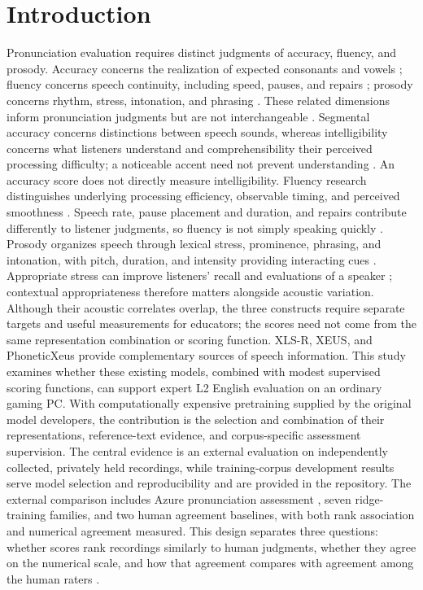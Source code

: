 \documentclass[10pt]{article}
\begin{document}
\section{Introduction}
Pronunciation evaluation requires distinct judgments of accuracy, fluency, and prosody. Accuracy concerns the realization of expected consonants and vowels \cite{deterding,cai}; fluency concerns speech continuity, including speed, pauses, and repairs \cite{kormos,bosker}; prosody concerns rhythm, stress, intonation, and phrasing \cite{cole,cutler}. These related dimensions inform pronunciation judgments but are not interchangeable \cite{cai,isaacs}. Segmental accuracy concerns distinctions between speech sounds, whereas intelligibility concerns what listeners understand and comprehensibility their perceived processing difficulty; a noticeable accent need not prevent understanding \cite{munro}. An accuracy score does not directly measure intelligibility. Fluency research distinguishes underlying processing efficiency, observable timing, and perceived smoothness \cite{segalowitz}. Speech rate, pause placement and duration, and repairs contribute differently to listener judgments, so fluency is not simply speaking quickly \cite{kormos,bosker}. Prosody organizes speech through lexical stress, prominence, phrasing, and intonation, with pitch, duration, and intensity providing interacting cues \cite{cole,cutler}. Appropriate stress can improve listeners' recall and evaluations of a speaker \cite{hahn}; contextual appropriateness therefore matters alongside acoustic variation. Although their acoustic correlates overlap, the three constructs require separate targets and useful measurements for educators; the scores need not come from the same representation combination or scoring function. XLS-R, XEUS, and PhoneticXeus provide complementary sources of speech information. This study examines whether these existing models, combined with modest supervised scoring functions, can support expert L2 English evaluation on an ordinary gaming PC. With computationally expensive pretraining supplied by the original model developers, the contribution is the selection and combination of their representations, reference-text evidence, and corpus-specific assessment supervision. The central evidence is an external evaluation on independently collected, privately held recordings, while training-corpus development results serve model selection and reproducibility and are provided in the repository. The external comparison includes Azure pronunciation assessment \cite{azure}, seven ridge-training families, and two human agreement baselines, with both rank association and numerical agreement measured. This design separates three questions: whether scores rank recordings similarly to human judgments, whether they agree on the numerical scale, and how that agreement compares with agreement among the human raters \cite{williamson}.
\end{document}
